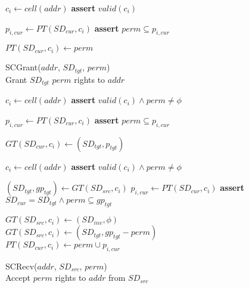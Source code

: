 \begin{figure*}[!t]
\begin{multicols}{2}
\begin{algorithm}[H]
\begin{algorithmic}[1]
        \State $c_i \gets cell(addr)$
        \State \textbf{assert} $valid(c_i)$

        \State $p_{i,cur} \gets PT(SD_{cur}, c_i) $
        \State \textbf{assert} $perm \subseteq p_{i,cur}$

        \State $PT(SD_{cur}, c_i) \gets perm$
      \end{algorithmic}
      \label{alg:scprotect}
    \end{algorithm}
    \vspace{-0.5\baselineskip}

    \begin{algorithm}[H]
      \caption{SCGrant($addr$, $SD_{tgt}$, $perm$) \\
      Grant $SD_{tgt}$ $perm$ rights to $addr$             }
      \begin{algorithmic}[1]

        \State $c_i \gets cell(addr)$
        \State \textbf{assert} $valid(c_i) \land perm \ne \phi$

        \State $p_{i,cur} \gets PT(SD_{cur}, c_i)$
        \State \textbf{assert} $perm \subseteq p_{i,cur}$

        \State $GT(SD_{cur}, c_i) \gets (SD_{tgt}, p_{tgt})$
      \end{algorithmic}
      \label{alg:scgrant}
    \end{algorithm}
    \vspace{-0.5\baselineskip}

    \begin{algorithm}[H]
      \caption{SCRecv($addr$, $SD_{src}$, $perm$) \\
      Accept $perm$ rights to $addr$ from $SD_{src}$      }
      \begin{algorithmic}[1]

        \State $c_i \gets cell(addr)$
        \State \textbf{assert} $valid(c_i) \land perm \ne \phi$

        \State $(SD_{tgt}, gp_{tgt}) \gets GT(SD_{src}, c_i)$
        \State $p_{i,cur} \gets PT(SD_{cur}, c_i)$
        \State \textbf{assert} $SD_{cur} = SD_{tgt} \land perm \subseteq gp_{tgt}$

          \State $GT(SD_{src}, c_i) \gets (SD_{inv}, \phi)$
        \Else
          \State $GT(SD_{src}, c_i) \gets (SD_{tgt}, gp_{tgt} - perm)$
        \EndIf
        \State $PT(SD_{cur}, c_i) \gets perm \cup p_{i, cur} $

      \end{algorithmic}
      \label{alg:screcv}
    \end{algorithm}
    \vspace{-\baselineskip}


\end{multicols}
\end{figure*}
